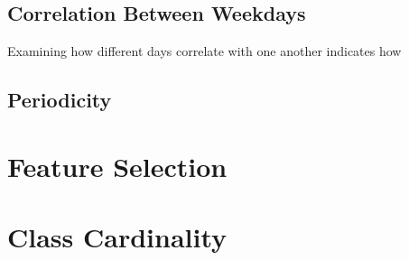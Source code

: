 \APODChild
\APODSocio


\subsection*{Correlation Between Weekdays}
Examining how different days correlate with one another indicates how

\corrChild
\corrSocio
\subsection{Periodicity}
		

\section{Feature Selection}

\section{Class Cardinality}